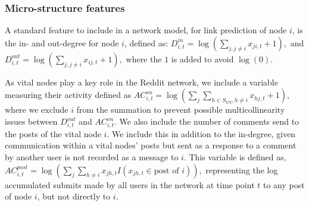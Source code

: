 
\subsubsection*{Micro-structure features}
A standard feature to include in a network model, for link prediction of node $i$, is the in- and out-degree for node $i$, defined as:
$
D_{i,t}^{in} = \log(\sum_{j, j \neq i} x_{ji,t}  + 1), 
$
and
$	
D_{i,t}^{out} = \log(\sum_{j, j\neq i} x_{ij,t}  + 1), 
$
where the $1$ is added to avoid $\log(0)$.

As vital nodes play a key role in the Reddit network, we include a variable measuring their activity defined as 
$
AC^{vn}_{i,t} = \log(\sum_{j} \sum_{h \in S_{VN}, h \neq i} x_{hj,t} + 1),  
$
where we exclude $i$ from the summation to prevent possible multicollinearity issues between $D_{i,t}^{out}$ and $	AC^{vn}_{i,t}$. 
We also include the number of comments send to the posts of the vital node $i$. We include this in addition to the in-degree, given communication within a vital nodes' posts but sent as a response to a comment by another user is not recorded as a message to $i$. This variable is defined as,
$
AC_{i,t}^{post} = \log(\sum_{j} \sum_{h\neq i} x_{jh,t}I(x_{jh,t} \in \text{post of } i)), 
$ %
representing the log accumulated submits made by all users in the network at time point $t$ to any post of node $i$, but not directly to $i$. %

